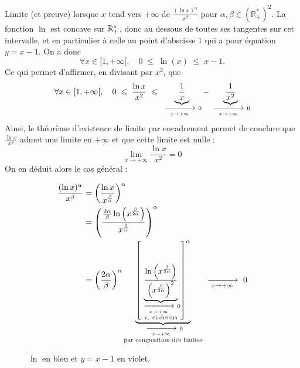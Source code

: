 \documentclass{article}
\renewenvironment{question_kholle}[2][ ]
{
	\subsection{\texorpdfstring{#2}{}}
	\notblank{#1}
	{
		\noindent #1
		\bigbreak
	}
	{}
	\begin{proof}
}
{
	\end{proof}
}
\begin{document}
\begin{question_kholle}{Limite (et preuve) lorsque $x$ tend vers $+\infty$ de $\displaystyle\frac{(\ln x)^{\alpha}}{x^{\beta}}$ pour $\alpha ,\beta \in \left( \mathbb{R}_+^*\right) ^2$.}
	La fonction $\ln$ est concave sur $\mathbb R_+^*$, donc au dessous de toutes ses tangentes sur cet intervalle, et en particulier à celle au point d'abscisse $1$ qui a pour équation $y=x-1$. On a donc
	\[
		\forall x \in [1,+\infty[, \quad 0 \; \leq \; \ln (x) \; \leq \; x-1.
	\]
	Ce qui permet d'affirmer, en divisant par $x^2$, que
	\[
		\forall{x}\in [1,+\infty[, \quad 0 \; \leqslant \; \frac{\ln x}{x^2} \; \leqslant \; \underbrace{\frac{1}{x}}_{\ \xrightarrow[\;x \to +\infty\;]{}\ 0} - \underbrace{\frac{1}{x^2}}_{\ \xrightarrow[\;x \to +\infty\;]{}\ 0}
	\]
	Ainsi, le théorème d'existence de limite par encadrement permet de conclure que $\frac{\ln x}{x^2}$ admet une limite en $+\infty$ et que cette limite est nulle :
	\[
		\lim_{x\to+\infty}\frac{\ln x}{x^2} = 0
	\]
	On en déduit alors le cas général :
	\\
	\begin{minipage}{0.7\textwidth}
		\begin{align*}
			\frac{(\ln x)^\alpha}{x^\beta} & = \left(\frac{\ln x}{x^{\frac{\beta}{\alpha}}}\right)^{\alpha}                                                                                                                                              \\
			                               & = \left(\frac{\frac{2\alpha}{\beta}\ln\left(x^{\frac{\beta}{2\alpha}}\right)}{x^{\frac{\beta}{\alpha}}}\right)^{\alpha}                                                                                     \\
			                               & = \left(\frac{2\alpha}{\beta}\right)^{\alpha} \underbrace{\left[\underbrace{\frac{\ln\left(x^{\frac{\beta}{2\alpha}}\right)}{\left(x^{\frac{\beta}{2\alpha}}\right)^{2}}}_{\substack{\ \xrightarrow[\;x \to +\infty\;]{}\ 0 \\\text{\scriptsize v. ci-dessus}}}\right]^{\alpha}}_{\substack{\ \xrightarrow[\;x \to +\infty\;]{}\ 0\\\text{par composition des limites}}} \ \xrightarrow[\;x \to +\infty\;]{}\  0
		\end{align*}
	\end{minipage}
	\begin{minipage}{0.3\textwidth}
		\begin{figure}[H]
			\centering
			\caption{$\ln$ en bleu et $y=x-1$ en violet.}
		\end{figure}
	\end{minipage}
\end{question_kholle}
\end{document}
